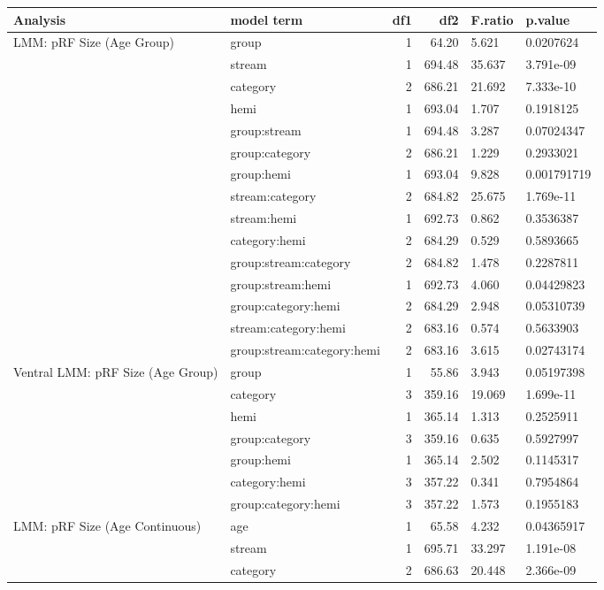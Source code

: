 \begin{table}
\centering
\begin{tabular}{llrrll}
\toprule
Analysis & model term & df1 & df2 & F.ratio & p.value\\
\midrule
LMM: pRF Size (Age Group) & group & 1 & 64.20 & 5.621 & 0.0207624\\
 & stream & 1 & 694.48 & 35.637 & 3.791e-09\\
 & category & 2 & 686.21 & 21.692 & 7.333e-10\\
 & hemi & 1 & 693.04 & 1.707 & 0.1918125\\
 & group:stream & 1 & 694.48 & 3.287 & 0.07024347\\
\addlinespace
 & group:category & 2 & 686.21 & 1.229 & 0.2933021\\
 & group:hemi & 1 & 693.04 & 9.828 & 0.001791719\\
 & stream:category & 2 & 684.82 & 25.675 & 1.769e-11\\
 & stream:hemi & 1 & 692.73 & 0.862 & 0.3536387\\
 & category:hemi & 2 & 684.29 & 0.529 & 0.5893665\\
\addlinespace
 & group:stream:category & 2 & 684.82 & 1.478 & 0.2287811\\
 & group:stream:hemi & 1 & 692.73 & 4.060 & 0.04429823\\
 & group:category:hemi & 2 & 684.29 & 2.948 & 0.05310739\\
 & stream:category:hemi & 2 & 683.16 & 0.574 & 0.5633903\\
 & group:stream:category:hemi & 2 & 683.16 & 3.615 & 0.02743174\\
\addlinespace
Ventral LMM: pRF Size (Age Group) & group & 1 & 55.86 & 3.943 & 0.05197398\\
 & category & 3 & 359.16 & 19.069 & 1.699e-11\\
 & hemi & 1 & 365.14 & 1.313 & 0.2525911\\
 & group:category & 3 & 359.16 & 0.635 & 0.5927997\\
 & group:hemi & 1 & 365.14 & 2.502 & 0.1145317\\
\addlinespace
 & category:hemi & 3 & 357.22 & 0.341 & 0.7954864\\
 & group:category:hemi & 3 & 357.22 & 1.573 & 0.1955183\\
LMM: pRF Size (Age Continuous) & age & 1 & 65.58 & 4.232 & 0.04365917\\
 & stream & 1 & 695.71 & 33.297 & 1.191e-08\\
 & category & 2 & 686.63 & 20.448 & 2.366e-09\\

\end{tabular}
\end{table}
